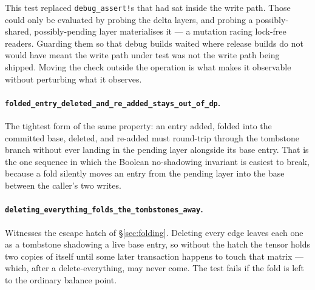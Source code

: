 \documentclass[11pt,a4paper]{article}
\theoremstyle{plain}
\theoremstyle{definition}
\theoremstyle{remark}
\begin{document}
This test replaced \texttt{debug\_assert!}s that had sat inside the write path.
Those could only be evaluated by probing the delta layers, and probing a
possibly-shared, possibly-pending layer materialises it --- a mutation racing
lock-free readers. Guarding them so that debug builds waited where release
builds do not would have meant the write path under test was not the write path
being shipped. Moving the check outside the operation is what makes it
observable without perturbing what it observes.

\paragraph{\texttt{folded\_entry\_deleted\_and\_re\_added\_stays\_out\_of\_dp}.}
The tightest form of the same property: an entry added, folded into the
committed base, deleted, and re-added must round-trip through the tombstone
branch without ever landing in the pending layer alongside its base entry. That
is the one sequence in which the Boolean no-shadowing invariant is easiest to
break, because a fold silently moves an entry from the pending layer into the
base between the caller's two writes.

\paragraph{\texttt{deleting\_everything\_folds\_the\_tombstones\_away}.}
Witnesses the escape hatch of \S\ref{sec:folding}. Deleting every edge leaves
each one as a tombstone shadowing a live base entry, so without the hatch the
tensor holds two copies of itself until some later transaction happens to touch
that matrix --- which, after a delete-everything, may never come. The test fails
if the fold is left to the ordinary balance point.
\end{document}
